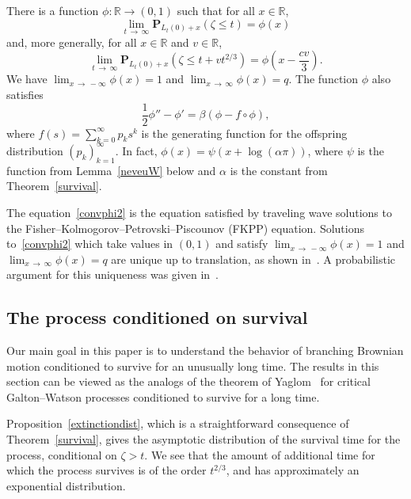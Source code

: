 \documentclass[AHL,Unicode,longabstracts,published]{cedram}
\renewcommand*\P{\mathbf{P}}
\newcommand*\R{\mathbb{R}}
\newcommand{\1} {\mathds{1}}
\begin{document}
\begin{theo}\label{survivex}
There is a function $\phi: \R \rightarrow (0,1)$ such that for all $x \in \R$,
\begin{equation}\label{convphi}
\lim_{t\,\rightarrow\,\infty} \P_{L_t(0) + x}(\zeta \leq t) = \phi(x)
\end{equation}
and, more generally, for all $x \in \R$ and $v \in \R$,
\begin{equation}\label{convphi2}
\lim_{t\,\rightarrow\,\infty} \P_{L_t(0)+x}\left(\zeta \leq t + vt^{2/3}\right) = \phi\left(x - \frac{cv}{3}\right).
\end{equation}
We have $\lim_{x\,\rightarrow\,-\infty} \phi(x) = 1$ and $\lim_{x\,\rightarrow\,\infty} \phi(x) = q$. The function $\phi$ also satisfies
\begin{equation}\label{FKPPwave}
\frac{1}{2} \phi'' - \phi' = \beta\left(\phi - f \circ \phi\right),
\end{equation}
where $f(s) = \sum_{k=0}^{\infty} p_k s^k$ is the generating function for the offspring distribution $(p_k)_{k=1}^{\infty}$. In fact, $\phi(x) = \psi(x+\log(\alpha\pi))$, where $\psi$ is the function from Lemma~\ref{neveuW} below and $\alpha$ is the constant from Theorem~\ref{survival}.
\end{theo}

The equation~\eqref{convphi2} is the equation satisfied by traveling wave solutions to the Fi\-sher--Kolmogorov--Petrovski--Piscounov (FKPP) equation. Solutions to~\eqref{convphi2} which take values in $(0,1)$ and satisfy $\lim_{x\,\rightarrow\,-\infty} \phi(x) = 1$ and $\lim_{x\,\rightarrow\,\infty} \phi(x) = q$ are unique up to translation, as shown in~\cite{kpp}. A probabilistic argument for this uniqueness was given in~\cite{kyp04}.


\subsection{The process conditioned on survival}
Our main goal in this paper is to understand the behavior of branching Brownian motion conditioned to survive for an unusually long time. The results in this section can be viewed as the analogs of the theorem of Yaglom~\cite{yaglom} for critical Galton--Watson processes conditioned to survive for a long time.

Proposition~\ref{extinctiondist}, which is a straightforward consequence of Theorem~\ref{survival}, gives the asymptotic distribution of the survival time for the process, conditional on $\zeta > t$. We see that the amount of additional time for which the process survives is of the order $t^{2/3}$, and has approximately an exponential distribution.
\end{document}
